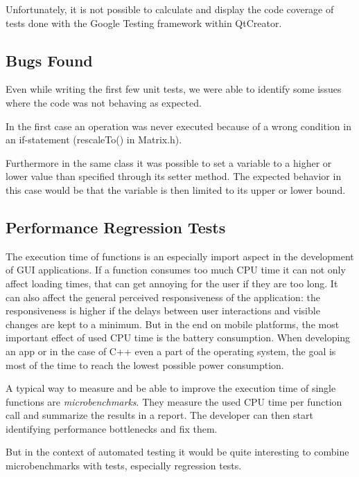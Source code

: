 \documentclass{scrreprt}
\begin{document}
Unfortunately, it is not possible to calculate and display the code coverage of tests done with the Google Testing framework within QtCreator.


\subsection{Bugs Found}

Even while writing the first few unit tests, we were able to identify some issues where the code was not behaving as expected.

In the first case an operation was never executed because of a wrong condition in an if-statement (rescaleTo() in Matrix.h).

Furthermore in the same class it was possible to set a variable to a higher or lower value than specified through its setter method. The expected behavior in this case would be that the variable is then limited to its upper or lower bound.

\subsection{Performance Regression Tests}

The execution time of functions is an especially import aspect in the development of GUI applications. If a function consumes too much CPU time it can not only affect loading times, that can get annoying for the user if they are too long. It can also affect the general perceived responsiveness of the application: the responsiveness is higher if the delays between user interactions and visible changes are kept to a minimum. But in the end on mobile platforms, the most important effect of used CPU time is the battery consumption. When developing an app or in the case of C++ even a part of the operating system, the goal is most of the time to reach the lowest possible power consumption.

A typical way to measure and be able to improve the execution time of single functions are \textit{microbenchmarks}. They measure the used CPU time per function call and summarize the results in a report. The developer can then start identifying performance bottlenecks and fix them.

But in the context of automated testing it would be quite interesting to combine microbenchmarks with tests, especially regression tests.
\end{document}
